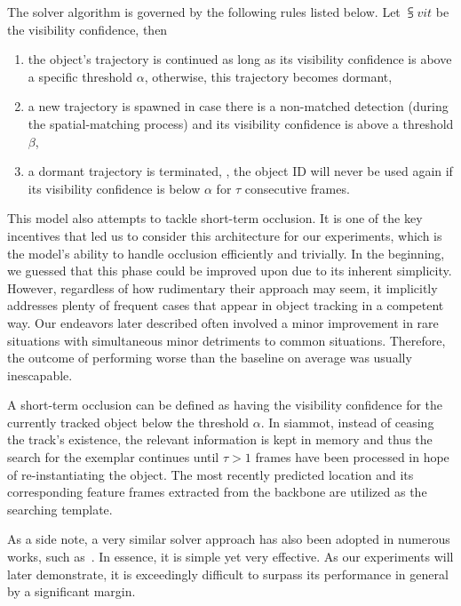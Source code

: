 
The solver algorithm is governed by the following rules listed below. Let $\subsup{v}{i}{t}$ be the visibility confidence, then
\begin{enumerate}
    \item the object's trajectory is continued as long as its visibility confidence is above a specific threshold $\alpha$, otherwise, this trajectory becomes dormant,
    \item a new trajectory is spawned in case there is a non-matched detection (during the spatial-matching process) and its visibility confidence is above a threshold $\beta$,
    \item a dormant trajectory is terminated, \ietext{}, the object ID will never be used again if its visibility confidence is below $\alpha$ for $\tau$ consecutive frames.
\end{enumerate}

This model also attempts to tackle short-term occlusion. It is one of the key incentives that led us to consider this architecture for our experiments, which is the model's ability to handle occlusion efficiently and trivially. In the beginning, we guessed that this phase could be improved upon due to its inherent simplicity. However, regardless of how rudimentary their approach may seem, it implicitly addresses plenty of frequent cases that appear in object tracking in a competent way. Our endeavors later described often involved a minor improvement in rare situations with simultaneous minor detriments to common situations. Therefore, the outcome of performing worse than the baseline on average was usually inescapable.

A short-term occlusion can be defined as having the visibility confidence for the currently tracked object below the threshold $\alpha$. In \gls{siammot}, instead of ceasing the track's existence, the relevant information is kept in memory and thus the search for the exemplar continues until $\tau > 1$ frames have been processed in hope of re-instantiating the object. The most recently predicted location and its corresponding feature frames extracted from the backbone are utilized as the searching template.

As a side note, a very similar solver approach has also been adopted in numerous works, such as~\cite{bawley2016simple, wojke2017simple, zhou2020tracking, bergmann2019tracking}. In essence, it is simple yet very effective. As our experiments will later demonstrate, it is exceedingly difficult to surpass its performance in general by a significant margin.

